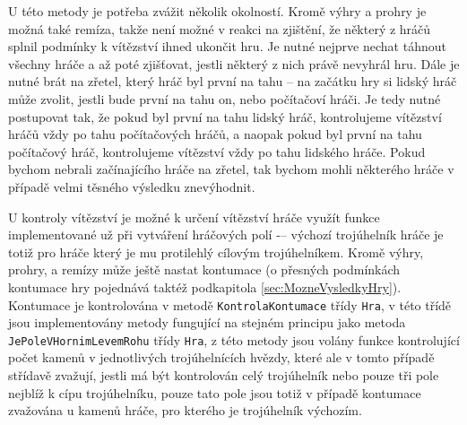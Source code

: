 U této metody je potřeba zvážit několik okolností. Kromě výhry a prohry je možná také remíza, takže není možné v reakci na zjištění, že některý z hráčů splnil podmínky k vítězství ihned ukončit hru. Je nutné nejprve nechat táhnout všechny hráče a až poté zjišťovat, jestli některý z nich právě nevyhrál hru. Dále je nutné brát na zřetel, který hráč byl první na tahu – na začátku hry si lidský hráč může zvolit, jestli bude první na tahu on, nebo počítačoví hráči. Je tedy nutné postupovat tak, že pokud byl první na tahu lidský hráč, kontrolujeme vítězství hráčů vždy po tahu počítačových hráčů, a naopak pokud byl první na tahu počítačový hráč, kontrolujeme vítězství vždy po tahu lidského hráče. Pokud bychom nebrali začínajícího hráče na zřetel, tak bychom mohli některého hráče v případě velmi těsného výsledku znevýhodnit.

U kontroly vítězství je možné k určení vítězství hráče využít funkce implementované už při vytváření hráčových polí -– výchozí trojúhelník hráče je totiž pro hráče který je mu protilehlý cílovým trojúhelníkem. Kromě výhry, prohry, a remízy může ještě nastat kontumace (o přesných podmínkách kontumace hry pojednává taktéž podkapitola \ref{sec:MozneVysledkyHry}). Kontumace je kontrolována v metodě \lstinline$KontrolaKontumace$ třídy \lstinline$Hra$, v této třídě jsou implementovány metody fungující na stejném principu jako metoda \lstinline$JePoleVHornimLevemRohu$ třídy \lstinline$Hra$, z této metody jsou volány funkce kontrolující počet kamenů v jednotlivých trojúhelnících hvězdy, které ale v tomto případě střídavě zvažují, jestli má být kontrolován celý trojúhelník nebo pouze tři pole nejblíž k cípu trojúhelníku, pouze tato pole jsou totiž v případě kontumace zvažována u kamenů hráče, pro kterého je trojúhelník výchozím.
\endinput